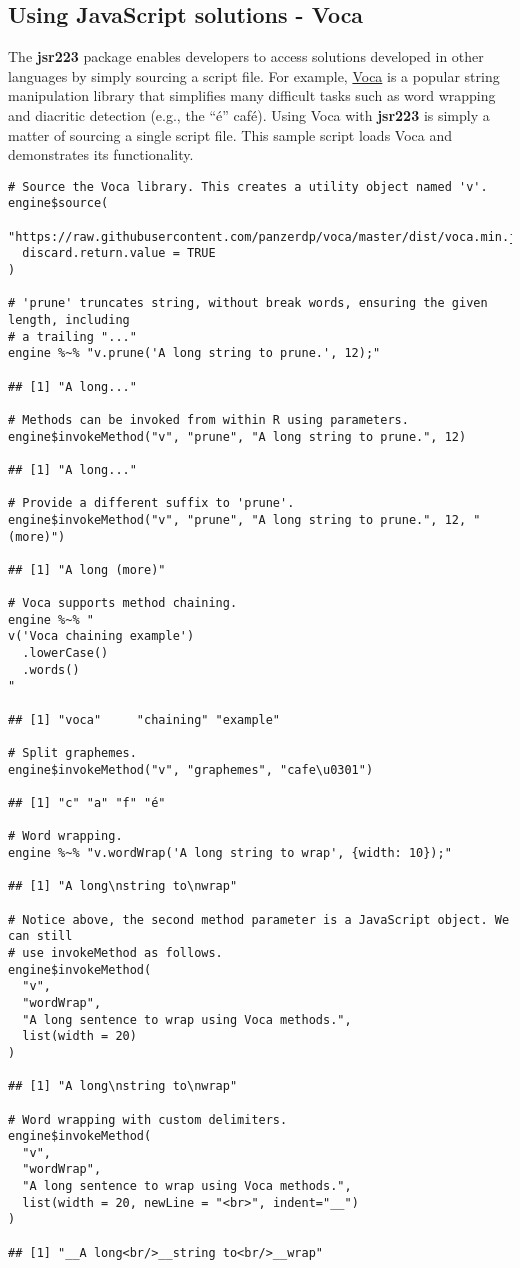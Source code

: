 \documentclass[
article,
11pt, %
a4paper, %
oneside, %
headinclude,footinclude, %
]{scrartcl}
\theoremstyle{definition} %
\theoremstyle{plain} %
\theoremstyle{remark} %
\newcommand{\pkg}[1]{\textbf{#1}}
\begin{document}
\hypertarget{using-javascript-solutions-voca}{}
\subsection{Using JavaScript solutions - Voca}

The \pkg{jsr223} package enables developers to access solutions developed in other languages by simply sourcing a script file. For example, \href{https://vocajs.com/}{Voca} is a popular string manipulation library that simplifies many difficult tasks such as word wrapping and diacritic detection (e.g., the “\'{e}” caf\'{e}). Using Voca with \pkg{jsr223} is simply a matter of sourcing a single script file. This sample script loads Voca and demonstrates its functionality.

\begin{verbatim}
# Source the Voca library. This creates a utility object named 'v'.
engine$source(
  "https://raw.githubusercontent.com/panzerdp/voca/master/dist/voca.min.js",
  discard.return.value = TRUE
)

# 'prune' truncates string, without break words, ensuring the given length, including
# a trailing "..."
engine %~% "v.prune('A long string to prune.', 12);"

## [1] "A long..."

# Methods can be invoked from within R using parameters.
engine$invokeMethod("v", "prune", "A long string to prune.", 12)

## [1] "A long..."

# Provide a different suffix to 'prune'.
engine$invokeMethod("v", "prune", "A long string to prune.", 12, "(more)")

## [1] "A long (more)"

# Voca supports method chaining.
engine %~% "
v('Voca chaining example')
  .lowerCase()
  .words()
"

## [1] "voca"     "chaining" "example"

# Split graphemes.
engine$invokeMethod("v", "graphemes", "cafe\u0301")

## [1] "c" "a" "f" "é"

# Word wrapping.
engine %~% "v.wordWrap('A long string to wrap', {width: 10});"

## [1] "A long\nstring to\nwrap"

# Notice above, the second method parameter is a JavaScript object. We can still
# use invokeMethod as follows.
engine$invokeMethod(
  "v", 
  "wordWrap", 
  "A long sentence to wrap using Voca methods.", 
  list(width = 20)
)

## [1] "A long\nstring to\nwrap"

# Word wrapping with custom delimiters.
engine$invokeMethod(
  "v", 
  "wordWrap", 
  "A long sentence to wrap using Voca methods.", 
  list(width = 20, newLine = "<br>", indent="__")
)

## [1] "__A long<br/>__string to<br/>__wrap"
\end{verbatim}
\end{document}

